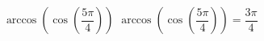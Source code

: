  {$\arccos\left(\cos\left(\dfrac{5\pi}{4}\right) \right)$}
{ $\arccos\left(\cos\left(\dfrac{5\pi}{4}\right) \right) = \dfrac{3\pi}{4}$}
